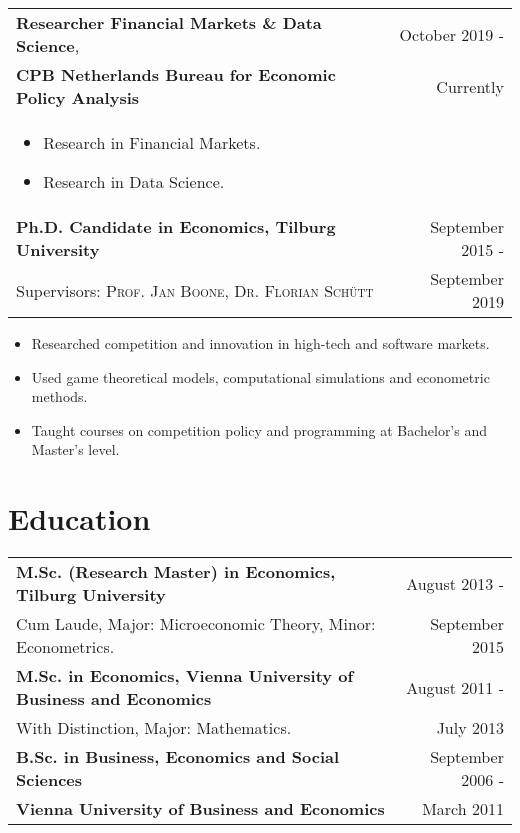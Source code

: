 \documentclass[a4paper,9pt]{article}
\begin{document}
\begin{tabular}{p{15cm} r}
  \textbf{Researcher Financial Markets \& Data Science}, &October 2019 -\\
  \textbf{CPB Netherlands Bureau for Economic Policy Analysis} &Currently\phantom{ -}\\ \vspace{-0.5em}
\begin{itemize}[noitemsep]
  \item Research in Financial Markets.
  \item Research in Data Science.
\end{itemize}\vspace{-1.0em}\\
	\textbf{Ph.D. Candidate in Economics, Tilburg University} &September 2015 -\\
	\small Supervisors:  \textsc{Prof. Jan Boone},  \textsc{Dr. Florian Schütt} & September 2019\phantom{ -}\\
\end{tabular}\vspace{-0.5em}
\begin{itemize}[noitemsep]
	\item Researched competition and innovation in high-tech and software markets.
	\item Used game theoretical models, computational simulations and econometric methods.
	\item Taught courses on competition policy and programming at Bachelor's and Master's level.
\end{itemize}

\section{Education}%

\begin{tabular}{p{15cm} r}
	\textbf{M.Sc. (Research Master) in Economics, Tilburg University}&  August 2013 -\\
	Cum Laude, Major: Microeconomic Theory, Minor: Econometrics.& September 2015\hphantom{-}
	\vspace{0.5em}\\
	\textbf{M.Sc. in Economics, Vienna University of Business and Economics}& August 2011 -\\
	With Distinction, Major: Mathematics. & July 2013\phantom{-}
	\vspace{0.5em}\\ 
	\textbf{B.Sc. in Business, Economics and Social Sciences}& September 2006 -\\ 
	\textbf{Vienna University of Business and Economics}& March 2011\phantom{- }\\
\end{tabular}\\
\end{document}
